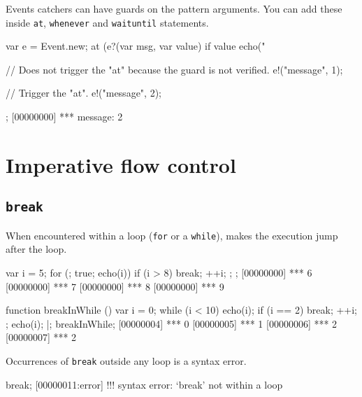 Events catchers can have guards on the pattern arguments.  You can add these
inside \lstinline{at}, \lstinline{whenever} and \lstinline{waituntil}
statements.

\begin{urbiscript}
{
  var e = Event.new;
  at (e?(var msg, var value) if value %
    echo("%

  // Does not trigger the "at" because the guard is not verified.
  e!("message", 1);

  // Trigger the "at".
  e!("message", 2);
};
[00000000] *** message: 2
\end{urbiscript}


\section{Imperative flow control}

\subsection{\lstinline{break}}
\label{sec:lang:break}

When encountered within a loop (\lstinline{for} or a \lstinline{while}),
 makes the execution jump after the loop.

\begin{urbiscript}
{
  var i = 5;
  for (; true; echo(i))
  {
    if (i > 8)
      break;
    ++i;
  };
};
[00000000] *** 6
[00000000] *** 7
[00000000] *** 8
[00000000] *** 9
\end{urbiscript}

\begin{urbiscript}
function breakInWhile ()
{
  var i = 0;
  while (i < 10)
  {
    echo(i);
    if (i == 2)
      break;
    ++i;
  };
  echo(i);
}|;
breakInWhile;
[00000004] *** 0
[00000005] *** 1
[00000006] *** 2
[00000007] *** 2
\end{urbiscript}

Occurrences of \lstinline{break} outside any loop is a syntax error.

\begin{urbiscript}
break;
[00000011:error] !!! syntax error: `break' not within a loop
\end{urbiscript}

